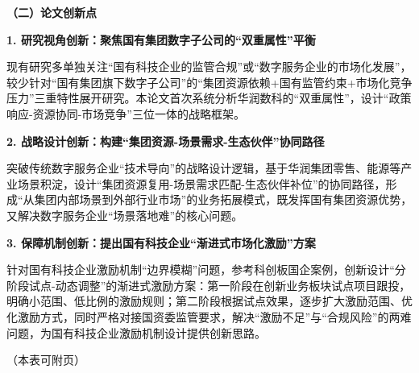 \documentclass[UTF8, a4paper, 11pt]{ctexart}
\begin{document}
\begin{UnifiedBox}
\vspace{0.5cm}
\noindent \textbf{（二）论文创新点}

\vspace{0.2cm}
\noindent \textbf{1. 研究视角创新：聚焦国有集团数字子公司的``双重属性''平衡}

现有研究多单独关注``国有科技企业的监管合规''或``数字服务企业的市场化发展''，较少针对``国有集团旗下数字子公司''的``集团资源依赖+国有监管约束+市场化竞争压力''三重特性展开研究。本论文首次系统分析华润数科的``双重属性''，设计``政策响应-资源协同-市场竞争''三位一体的战略框架。

\vspace{0.2cm}
\noindent \textbf{2. 战略设计创新：构建``集团资源-场景需求-生态伙伴''协同路径}

突破传统数字服务企业``技术导向''的战略设计逻辑，基于华润集团零售、能源等产业场景积淀，设计``集团资源复用-场景需求匹配-生态伙伴补位''的协同路径，形成``从集团内部场景到外部行业市场''的业务拓展模式，既发挥国有集团资源优势，又解决数字服务企业``场景落地难''的核心问题。

\vspace{0.2cm}
\noindent \textbf{3. 保障机制创新：提出国有科技企业``渐进式市场化激励''方案}

针对国有科技企业激励机制``边界模糊''问题，参考科创板国企案例，创新设计``分阶段试点-动态调整''的渐进式激励方案：第一阶段在创新业务板块试点项目跟投，明确小范围、低比例的激励规则；第二阶段根据试点效果，逐步扩大激励范围、优化激励方式，同时严格对接国资委监管要求，解决``激励不足''与``合规风险''的两难问题，为国有科技企业激励机制设计提供创新思路。

\vspace*{\fill}

\begin{flushright} （本表可附页） \end{flushright}
\end{UnifiedBox}

\newpage

\vspace{0.6cm}

\vspace{0.3cm}
\end{document}
